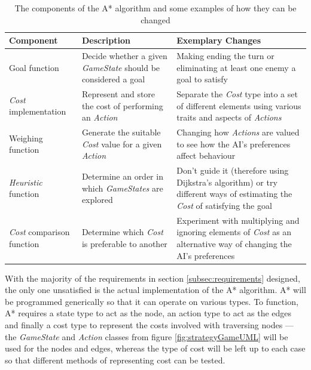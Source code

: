 \documentclass[11pt, a4paper]{report}
\begin{document}
\begin{table}[!h]
  \centering
  \begin{tabular}{ | m{2.5cm} | m{4cm} | m{6cm} |}
    \hline
    \textbf{Component} & \textbf{Description} & \textbf{Exemplary Changes} \\ \hline
    Goal function & Decide whether a given \emph{GameState} should be considered a goal & Making ending the turn or eliminating at least one enemy a goal to satisfy \\ \hline
    \emph{Cost} implementation & Represent and store the cost of performing an \emph{Action} & Separate the \emph{Cost} type into a set of different elements using various traits and aspects of \emph{Actions} \\ \hline
    Weighing function & Generate the suitable \emph{Cost} value for a given \emph{Action} & Changing how \emph{Actions} are valued to see how the AI's preferences affect behaviour \\ \hline
    \emph{Heuristic} function & Determine an order in which \emph{GameStates} are explored & Don't guide it (therefore using Dijkstra's algorithm) or try different ways of estimating the \emph{Cost} of satisfying the goal \\ \hline
    \emph{Cost} comparison function & Determine which \emph{Cost} is preferable to another & Experiment with multiplying and ignoring elements of \emph{Cost} as an alternative way of changing the AI's preferences \\
    \hline
  \end{tabular}
  \caption{The components of the A* algorithm and some examples of how they can be changed}
  \label{table:designingAStarVariations}
\end{table}

With the majority of the requirements in section \ref{subsec:requirements} designed, the only one unsatisfied is the actual implementation of the A* algorithm. A* will be programmed generically so that it can operate on various types. To function, A* requires a state type to act as the node, an action type to act as the edges and finally a cost type to represent the costs involved with traversing nodes --- the \emph{GameState} and \emph{Action} classes from figure \ref{fig:strategyGameUML} will be used for the nodes and edges, whereas the type of cost will be left up to each case so that different methods of representing cost can be tested.
\end{document}
